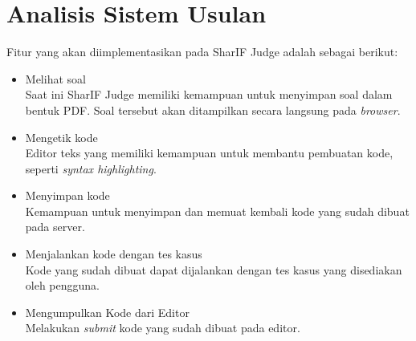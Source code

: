 \section{Analisis Sistem Usulan}
\label{sec:3:analisisusulan} 
Fitur yang akan diimplementasikan pada SharIF Judge adalah sebagai berikut:

\begin{itemize}
    \item Melihat soal \\ Saat ini SharIF Judge memiliki kemampuan untuk menyimpan soal dalam bentuk PDF. Soal tersebut akan ditampilkan secara langsung pada \textit{browser}.
    \item Mengetik kode \\ Editor teks yang memiliki kemampuan untuk membantu pembuatan kode, seperti \textit{syntax highlighting}.
    \item Menyimpan kode \\ Kemampuan untuk menyimpan dan memuat kembali kode yang sudah dibuat pada server.
    \item Menjalankan kode dengan tes kasus \\  Kode yang sudah dibuat dapat dijalankan dengan tes kasus yang disediakan oleh pengguna.
    \item Mengumpulkan Kode dari Editor \\  Melakukan \textit{submit} kode yang sudah dibuat pada editor.
\end{itemize}